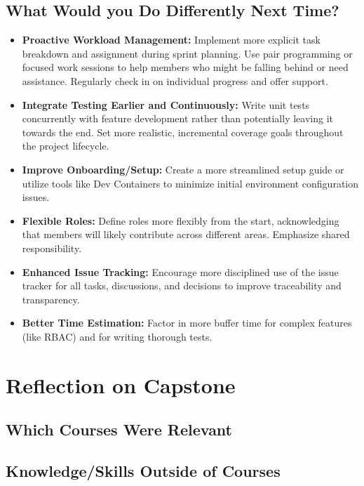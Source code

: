 \documentclass{article}
\begin{document}
\subsection{What Would you Do Differently Next Time?}

\begin{itemize}
  \item \textbf{Proactive Workload Management:} Implement more explicit task breakdown and assignment during sprint planning. Use pair programming or focused work sessions to help members who might be falling behind or need assistance. Regularly check in on individual progress and offer support.
  \item \textbf{Integrate Testing Earlier and Continuously:} Write unit tests concurrently with feature development rather than potentially leaving it towards the end. Set more realistic, incremental coverage goals throughout the project lifecycle.
  \item \textbf{Improve Onboarding/Setup:} Create a more streamlined setup guide or utilize tools like Dev Containers to minimize initial environment configuration issues.
  \item \textbf{Flexible Roles:} Define roles more flexibly from the start, acknowledging that members will likely contribute across different areas. Emphasize shared responsibility.
  \item \textbf{Enhanced Issue Tracking:} Encourage more disciplined use of the issue tracker for all tasks, discussions, and decisions to improve traceability and transparency.
  \item \textbf{Better Time Estimation:} Factor in more buffer time for complex features (like RBAC) and for writing thorough tests.
\end{itemize}

\section{Reflection on Capstone}


\subsection{Which Courses Were Relevant}


\subsection{Knowledge/Skills Outside of Courses}

\end{document}
